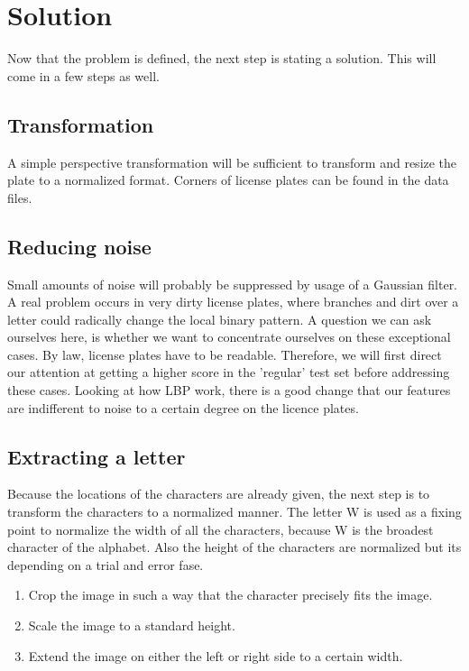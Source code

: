 \documentclass[a4paper]{article}
\begin{document}
\section{Solution}

Now that the problem is defined, the next step is stating a solution. This will
come in a few steps as well.

\subsection{Transformation}

A simple perspective transformation will be sufficient to transform and resize 
the plate to a normalized format. Corners of license plates can be found in the
data files.

\subsection{Reducing noise}

Small amounts of noise will probably be suppressed by usage of a Gaussian
filter. A real problem occurs in very dirty license plates, where branches and
dirt over a letter could radically change the local binary pattern. A question
we can ask ourselves here, is whether we want to concentrate ourselves on
these exceptional cases. By law, license plates have to be readable. Therefore, 
we will first direct our attention at getting a higher score in the 'regular' 
test set before addressing these cases. Looking at how LBP work, there is a good 
change that our features are indifferent to noise to a certain degree on the 
licence plates.

\subsection{Extracting a letter}

Because the locations of the characters are already given, the next step is to
transform the characters to a normalized manner. The letter W is used as a
fixing point to normalize the width of all the characters, because W is the
broadest character of the alphabet. Also the height of the characters are 
normalized but its depending on a trial and error fase. 

\begin{enumerate}
\item Crop the image in such a way that the character precisely fits the image.
\item Scale the image to a standard height.
\item Extend the image on either the left or right side to a certain width. 
\end{enumerate}
\end{document}
